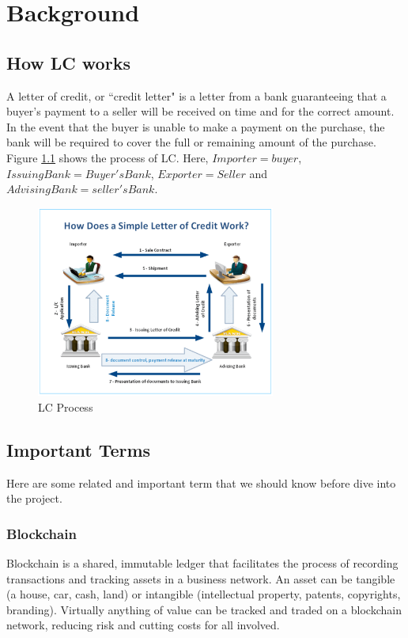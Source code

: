 \documentclass[a4paper,12pt]{report}
\begin{document}
\chapter{Background}
\section{How LC works}
A letter of credit, or ``credit letter" is a letter from a bank guaranteeing that a buyer's payment to a seller will be received on time and for the correct amount. In the event that the buyer is unable to make a payment on the purchase, the bank will be required to cover the full or remaining amount of the purchase.\\
 Figure \ref{fig:lcprocess} shows the process of LC. Here, $Importer=buyer$, $Issuing Bank=Buyer's Bank$, $Exporter=Seller$ and $Advising Bank= seller's Bank$.

\begin{figure}[h]
    \centering
    \includegraphics[width=0.7\textwidth]{letter-of-credit-process.pdf}
    \caption{LC Process}
    \label{fig:lcprocess}
\end{figure}

\section{Important Terms}
Here are some related and important term that we should know before dive into the project.
\subsection{Blockchain}
Blockchain is a shared, immutable ledger that facilitates the process of recording transactions and tracking assets in a business network. An asset can be tangible (a house, car, cash, land) or intangible (intellectual property, patents, copyrights, branding). Virtually anything of value can be tracked and traded on a blockchain network, reducing risk and cutting costs for all involved\cite{Blockchain}.
\end{document}
